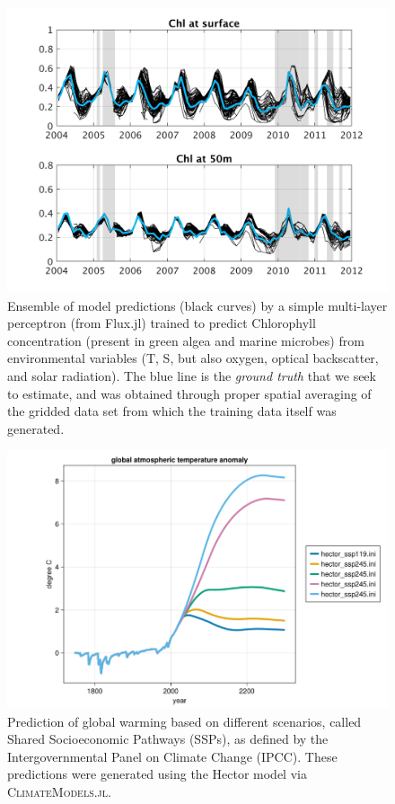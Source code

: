 \documentclass{juliacon}[12pt]
\newcommand{\pkg}[1]{{\small \textsc{#1}}}
\begin{document}
\begin{figure}[th] 
\includegraphics[width=\columnwidth]{figs/Chl_av_NN3D5.jpg}
\caption{Ensemble of model predictions (black curves) by a simple multi-layer perceptron (from Flux.jl) trained to predict Chlorophyll concentration (present in green algea and marine microbes) from environmental variables (T, S, but also oxygen, optical backscatter, and solar radiation). The blue line is the {\it ground truth} that we seek to estimate, and was obtained through proper spatial averaging of the gridded data set from which the training data itself was generated.}
\label{fig:MLP}
\end{figure} 

\begin{figure}[th] 
\includegraphics[width=\columnwidth]{figs/HectorDemo.png}
\caption{Prediction of global warming based on different scenarios, called Shared Socioeconomic Pathways (SSPs), as defined by the Intergovernmental Panel on Climate Change (IPCC). These predictions were generated using the Hector model \cite{Hector2015} via \pkg{ClimateModels.jl}.}
\label{fig:globalwarming}
\end{figure} 
\end{document}
